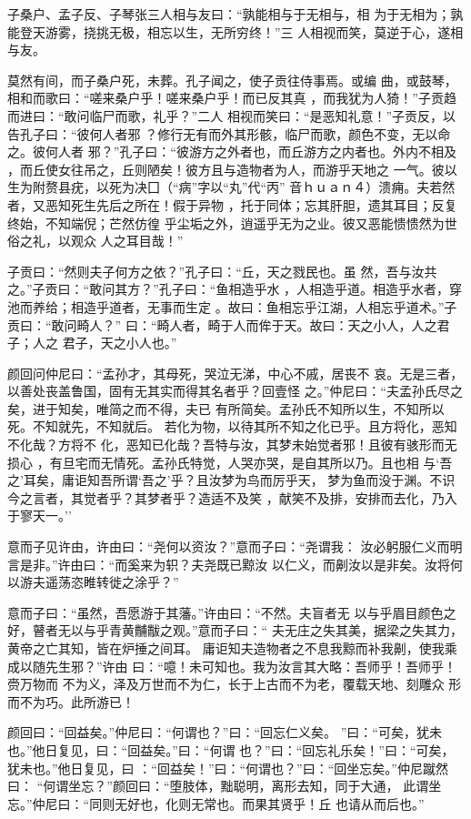 \documentclass[]{article}
\begin{document}
子桑户、孟子反、子琴张三人相与友曰：``孰能相与于无相与，相
为于无相为；孰能登天游雾，挠挑无极，相忘以生，无所穷终！''三
人相视而笑，莫逆于心，遂相与友。

莫然有间，而子桑户死，未葬。孔子闻之，使子贡往侍事焉。或编
曲，或鼓琴，相和而歌曰：``嗟来桑户乎！嗟来桑户乎！而已反其真
，而我犹为人猗！''子贡趋而进曰：``敢问临尸而歌，礼乎？''二人
相视而笑曰：``是恶知礼意！''子贡反，以告孔子曰：``彼何人者邪
？修行无有而外其形骸，临尸而歌，颜色不变，无以命之。彼何人者
邪？''孔子曰：``彼游方之外者也，而丘游方之内者也。外内不相及
，而丘使女往吊之，丘则陋矣！彼方且与造物者为人，而游乎天地之
一气。彼以生为附赘县疣，以死为决囗（``病''字以``丸''代``丙''
音ｈｕａｎ４）溃痈。夫若然者，又恶知死生先后之所在！假于异物
，托于同体；忘其肝胆，遗其耳目；反复终始，不知端倪；芒然仿徨
乎尘垢之外，逍遥乎无为之业。彼又恶能愦愦然为世俗之礼，以观众
人之耳目哉！''

子贡曰：``然则夫子何方之依？''孔子曰：``丘，天之戮民也。虽
然，吾与汝共之。''子贡曰：``敢问其方？''孔子曰：``鱼相造乎水
，人相造乎道。相造乎水者，穿池而养给；相造乎道者，无事而生定
。故曰：鱼相忘乎江湖，人相忘乎道术。''子贡曰：``敢问畸人？''
曰：``畸人者，畸于人而侔于天。故曰：天之小人，人之君子；人之
君子，天之小人也。''

颜回问仲尼曰：``孟孙才，其母死，哭泣无涕，中心不戚，居丧不
哀。无是三者，以善处丧盖鲁国，固有无其实而得其名者乎？回壹怪
之。''仲尼曰：``夫孟孙氏尽之矣，进于知矣，唯简之而不得，夫已
有所简矣。孟孙氏不知所以生，不知所以死。不知就先，不知就后。
若化为物，以待其所不知之化已乎。且方将化，恶知不化哉？方将不
化，恶知已化哉？吾特与汝，其梦未始觉者邪！且彼有骇形而无损心
，有旦宅而无情死。孟孙氏特觉，人哭亦哭，是自其所以乃。且也相
与`吾之'耳矣，庸讵知吾所谓`吾之'乎？且汝梦为鸟而厉乎天，
梦为鱼而没于渊。不识今之言者，其觉者乎？其梦者乎？造适不及笑
，献笑不及排，安排而去化，乃入于寥天一。''

意而子见许由，许由曰：``尧何以资汝？''意而子曰：``尧谓我：
汝必躬服仁义而明言是非。''许由曰：``而奚来为轵？夫尧既已黥汝
以仁义，而劓汝以是非矣。汝将何以游夫遥荡恣睢转徙之涂乎？''

意而子曰：``虽然，吾愿游于其藩。''许由曰：``不然。夫盲者无
以与乎眉目颜色之好，瞽者无以与乎青黄黼黻之观。''意而子曰：``
夫无庄之失其美，据梁之失其力，黄帝之亡其知，皆在炉捶之间耳。
庸讵知夫造物者之不息我黥而补我劓，使我乘成以随先生邪？''许由
曰：``噫！未可知也。我为汝言其大略：吾师乎！吾师乎！赍万物而
不为义，泽及万世而不为仁，长于上古而不为老，覆载天地、刻雕众
形而不为巧。此所游已！

颜回曰：``回益矣。''仲尼曰：``何谓也？''曰：``回忘仁义矣。
''曰：``可矣，犹未也。''他日复见，曰：``回益矣。''曰：``何谓
也？''曰：``回忘礼乐矣！''曰：``可矣，犹未也。''他日复见，曰
：``回益矣！''曰：``何谓也？''曰：``回坐忘矣。''仲尼蹴然曰：
``何谓坐忘？''颜回曰：``堕肢体，黜聪明，离形去知，同于大通，
此谓坐忘。''仲尼曰：``同则无好也，化则无常也。而果其贤乎！丘
也请从而后也。''
\end{document}
